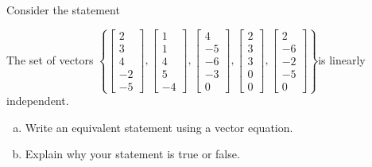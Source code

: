 
\begin{exerciseStatement}


Consider the statement 
\begin{center}\begin{minipage}{0.8\textwidth}
 The set of vectors \( \left\{ \left[\begin{array}{c}
2 \\
3 \\
4 \\
-2 \\
-5
\end{array}\right] , \left[\begin{array}{c}
1 \\
1 \\
4 \\
5 \\
-4
\end{array}\right] , \left[\begin{array}{c}
4 \\
-5 \\
-6 \\
-3 \\
0
\end{array}\right] , \left[\begin{array}{c}
2 \\
3 \\
3 \\
0 \\
0
\end{array}\right] , \left[\begin{array}{c}
2 \\
-6 \\
-2 \\
-5 \\
0
\end{array}\right] \right\} \)is linearly independent.
\end{minipage}\end{center}
    


\begin{enumerate}[(a)]
\item  Write an equivalent statement using a vector equation.
\item  Explain why your statement is true or false.
\end{enumerate}
    
\end{exerciseStatement}
    
